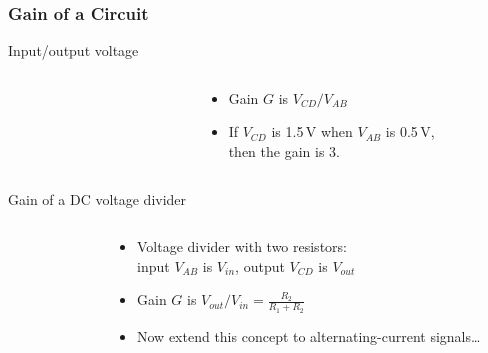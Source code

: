 \documentclass[beamer]{standalone}
\begin{document}
\begin{frame}[t]
 \frametitle{Gain of a Circuit}
 \begin{block}{Input/output voltage}
  \begin{columns}
   \begin{column}{0.0\textwidth}
   \end{column}
   \begin{column}{0.35\textwidth}
   \end{column}
   \begin{column}{0.65\textwidth}
    \begin{itemize}
     \item Gain $G$ is $V_{CD} / V_{AB}$
     \item If $V_{CD}$ is 1.5\,V when $V_{AB}$ is 0.5\,V, \\ then the gain is 3.
    \end{itemize}
   \end{column}
  \end{columns}
 \end{block}
 \begin{block}{Gain of a DC voltage divider}
  \begin{columns}
   \begin{column}{0.0\textwidth}
   \end{column}
   \begin{column}{0.2\textwidth}
   \end{column}
   \begin{column}{0.8\textwidth}
    \begin{itemize}
     \item Voltage divider with two resistors: \\ input $V_{AB}$ is $V_{in}$, output $V_{CD}$ is $V_{out}$
     \item Gain $G$ is $V_{out} / V_{in} = \frac{R_2}{R_1 + R_2}$
     \item Now extend this concept to alternating-current signals\ldots
    \end{itemize}
   \end{column}
  \end{columns}
 \end{block}
\end{frame}
\end{document}
